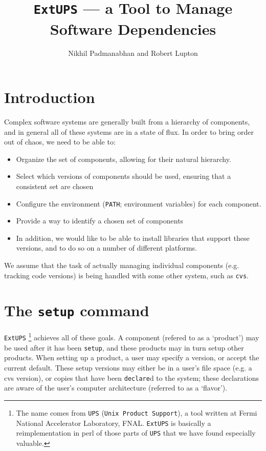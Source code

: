 \documentclass{article}
\newcommand{\code}[1]{\texttt{#1}}
\newcommand{\eups}{\code{ExtUPS}}
\begin{document}
\title{\eups{} --- a Tool to Manage Software Dependencies}
\author{Nikhil Padmanabhan and Robert Lupton}

\maketitle


\section{Introduction}

Complex software systems are generally built from a hierarchy of
components, and in general all of these systems are in a state of
flux.  In order to bring order out of chaos, we need to be able to:
\begin{itemize}
  \item Organize the set of components, allowing for their natural
    hierarchy.

  \item
    Select which versions of components should be used, ensuring
    that a consistent set are chosen

  \item
    Configure the environment (\code{PATH}; environment variables)
    for each component.

  \item
    Provide a way to identify a chosen set of components

  \item
    In addition, we would like to be able to install libraries that support
    these versions, and to do so on a number of different platforms.
\end{itemize}

We assume that the task of actually managing individual components
(e.g. tracking code versions) is being handled with some other system,
such as \texttt{cvs}.

\section{The \code{setup} command}

\eups
\footnote{%
  The name comes from \code{UPS} (\code{Unix Product Support}), a
  tool written at Fermi National Accelerator Laboratory, FNAL. \eups{}
  is basically a reimplementation in perl of those parts of \code{UPS}
  that we have found especially valuable.}
achieves all of these goals. A component (refered to as a `product')
may be used after it has been \code{setup}, and these products may
in turn setup other products. When setting up a product, a user
may specify a version, or accept the current default. These setup versions
may either be in a user's file space (e.g. a cvs version), or copies
that have been \code{declare}d to the system; these declarations are
aware of the user's computer architecture (referred to as a `flavor').
\end{document}
